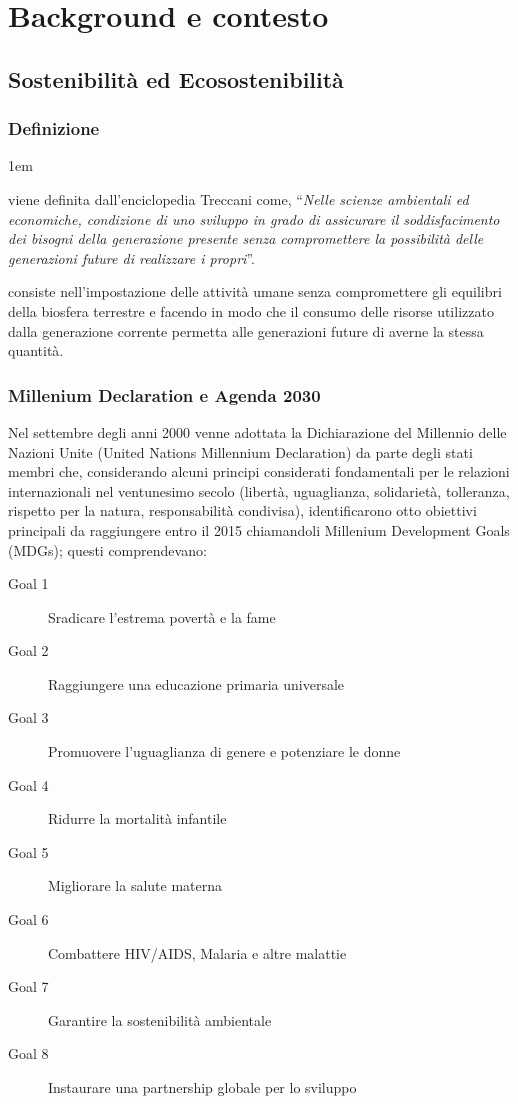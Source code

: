 \chapter{Background e contesto}
%
\section{Sostenibilità ed Ecosostenibilità}
\subsection{Definizione}
\begin{description}
    \itemsep1em
    \item [Sostenibilità] viene definita dall'enciclopedia Treccani \cite{treccaniEnc} come, \enquote{\textit{Nelle scienze ambientali ed economiche, condizione di uno sviluppo in grado di assicurare il soddisfacimento dei bisogni della generazione presente senza compromettere la possibilità delle generazioni future di realizzare i propri}}.
    \item [Ecosostenibilità] consiste nell'impostazione delle attività umane senza compromettere gli equilibri della biosfera terrestre e facendo in modo che il consumo delle risorse utilizzato dalla generazione corrente permetta alle generazioni future di averne la stessa quantità.
\end{description}
\newpage
\subsection{Millenium Declaration e Agenda 2030}
Nel settembre degli anni 2000 venne adottata la Dichiarazione del Millennio delle Nazioni Unite (United Nations Millennium Declaration) \cite{millennium_declaration} da parte degli stati membri che, considerando alcuni principi considerati fondamentali per le relazioni internazionali nel ventunesimo secolo (libertà, uguaglianza, solidarietà, tolleranza, rispetto per la natura, responsabilità condivisa), identificarono otto obiettivi principali da raggiungere entro il 2015 chiamandoli Millenium Development Goals (MDGs); questi comprendevano:
\begin{description}
    \item[Goal 1] Sradicare l'estrema povertà e la fame
    \item[Goal 2] Raggiungere una educazione primaria universale
    \item[Goal 3] Promuovere l'uguaglianza di genere e potenziare le donne
    \item[Goal 4] Ridurre la mortalità infantile
    \item[Goal 5] Migliorare la salute materna
    \item[Goal 6] Combattere HIV/AIDS, Malaria e altre malattie
    \item[Goal 7] Garantire la sostenibilità ambientale
    \item[Goal 8] Instaurare una partnership globale per lo sviluppo
\end{description}

